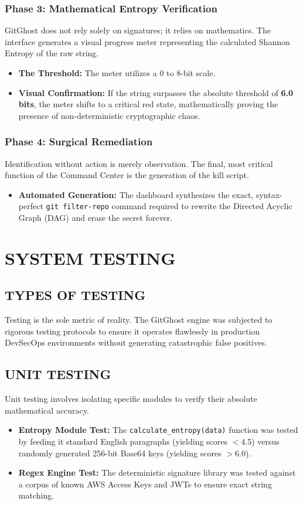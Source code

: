 \documentclass[12pt, a4paper, oneside]{report}
\begin{document}
\subsection{Phase 3: Mathematical Entropy Verification}
GitGhost does not rely solely on signatures; it relies on mathematics. The interface generates a visual progress meter representing the calculated Shannon Entropy of the raw string.
\begin{itemize}
    \item \textbf{The Threshold:} The meter utilizes a 0 to 8-bit scale. 
    \item \textbf{Visual Confirmation:} If the string surpasses the absolute threshold of \textbf{6.0 bits}, the meter shifts to a critical red state, mathematically proving the presence of non-deterministic cryptographic chaos.
\end{itemize}

\subsection{Phase 4: Surgical Remediation}
Identification without action is merely observation. The final, most critical function of the Command Center is the generation of the kill script.
\begin{itemize}
    \item \textbf{Automated Generation:} The dashboard synthesizes the exact, syntax-perfect \texttt{git filter-repo} command required to rewrite the Directed Acyclic Graph (DAG) and erase the secret forever.
\end{itemize}

\chapter{SYSTEM TESTING}

\section{TYPES OF TESTING}
Testing is the sole metric of reality. The GitGhost engine was subjected to rigorous testing protocols to ensure it operates flawlessly in production DevSecOps environments without generating catastrophic false positives.

\section{UNIT TESTING}
Unit testing involves isolating specific modules to verify their absolute mathematical accuracy.
\begin{itemize}
    \item \textbf{Entropy Module Test:} The \texttt{calculate\_entropy(data)} function was tested by feeding it standard English paragraphs (yielding scores $< 4.5$) versus randomly generated 256-bit Base64 keys (yielding scores $> 6.0$).
    \item \textbf{Regex Engine Test:} The deterministic signature library was tested against a corpus of known AWS Access Keys and JWTs to ensure exact string matching.
\end{itemize}
\end{document}
